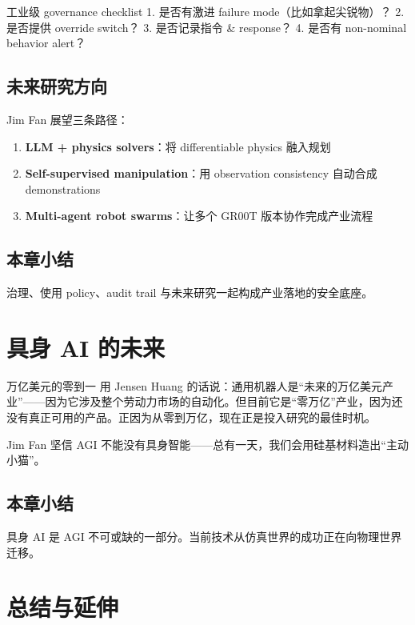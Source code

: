 \documentclass[a4paper]{article}
\begin{document}
\begin{importantbox}{工业级 governance checklist}
1. 是否有激进 failure mode（比如拿起尖锐物）？ 2. 是否提供 override switch？ 3. 是否记录指令 \& response？ 4. 是否有 non-nominal behavior alert？
\end{importantbox}

\subsection{未来研究方向}

Jim Fan 展望三条路径：

\begin{enumerate}
    \item \textbf{LLM + physics solvers}：将 differentiable physics 融入规划
    \item \textbf{Self-supervised manipulation}：用 observation consistency 自动合成 demonstrations
    \item \textbf{Multi-agent robot swarms}：让多个 GR00T 版本协作完成产业流程
\end{enumerate}

\subsection{本章小结}

治理、使用 policy、audit trail 与未来研究一起构成产业落地的安全底座。

\section{具身 AI 的未来}

\begin{importantbox}{万亿美元的零到一}
用 Jensen Huang 的话说：通用机器人是``未来的万亿美元产业''——因为它涉及整个劳动力市场的自动化。但目前它是``零万亿''产业，因为还没有真正可用的产品。正因为从零到万亿，现在正是投入研究的最佳时机。
\end{importantbox}

Jim Fan 坚信 AGI 不能没有具身智能——总有一天，我们会用硅基材料造出``主动小猫''。

\subsection{本章小结}

具身 AI 是 AGI 不可或缺的一部分。当前技术从仿真世界的成功正在向物理世界迁移。

\section{总结与延伸}
\end{document}

